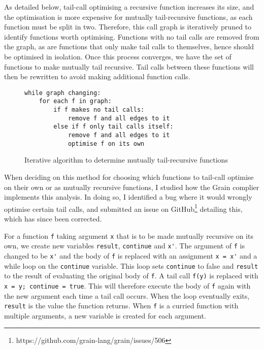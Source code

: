 As detailed below, tail-call optimising a recursive function increases its size, and the optimisation is more expensive for mutually tail-recursive functions, as each function must be split in two. Therefore, this call graph is iteratively pruned to identify functions worth optimising. Functions with no tail calls are removed from the graph, as are functions that only make tail calls to themselves, hence should be optimised in isolation. Once this process converges, we have the set of functions to make mutually tail recursive. Tail calls between these functions will then be rewritten to avoid making additional function calls.



\begin{figure}[H]
\centering
\begin{BVerbatim}
while graph changing:
    for each f in graph:
        if f makes no tail calls:
            remove f and all edges to it
        else if f only tail calls itself:
            remove f and all edges to it
            optimise f on its own
\end{BVerbatim}
\caption{Iterative algorithm to determine mutually tail-recursive functions}
\end{figure}


When deciding on this method for choosing which functions to tail-call optimise on their own or as mutually recursive functions, I studied how the Grain complier implements this analysis. In doing so, I identified a bug where it would wrongly optimise certain tail calls, and submitted an issue on GitHub\footnote{https://github.com/grain-lang/grain/issues/506} detailing this, which has since been corrected. %

For a function \verb|f| taking argument \verb|x| that is to be made mutually recursive on its own, we create new variables \verb|result|, \verb|continue| and \verb|x'|. The argument of \verb|f| is changed to be \verb|x'| and the body of \verb|f| is replaced with an assignment \verb|x = x'| and a while loop on the \verb|continue| variable. This loop sets \verb|continue| to false and \verb|result| to the result of evaluating the original body of \verb|f|. A tail call \verb|f(y)| is replaced with \verb|x = y; continue = true|. This will therefore execute the body of \verb|f| again with the new argument each time a tail call occurs. When the loop eventually exits, \verb|result| is the value the function returns. When \verb|f| is a curried function with multiple arguments, a new variable is created for each argument.


